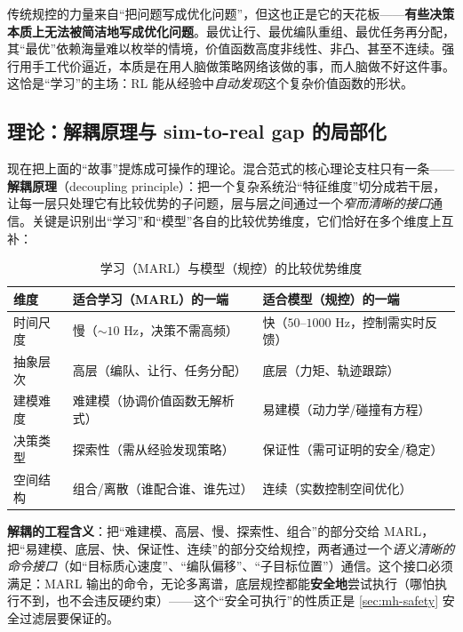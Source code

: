 \begin{insight}
传统规控的力量来自“把问题写成优化问题”，但这也正是它的天花板——\textbf{有些决策本质上无法被简洁地写成优化问题}。最优让行、最优编队重组、最优任务再分配，其“最优”依赖海量难以枚举的情境，价值函数高度非线性、非凸、甚至不连续。强行用手工代价逼近，本质是在用人脑做策略网络该做的事，而人脑做不好这件事。这恰是“学习”的主场：RL 能从经验中\emph{自动发现}这个复杂价值函数的形状。
\end{insight}

\subsection{理论：解耦原理与 sim-to-real gap 的局部化}
\label{sec:mh-decoupling}

现在把上面的“故事”提炼成可操作的理论。混合范式的核心理论支柱只有一条——\textbf{解耦原理}（decoupling principle）：把一个复杂系统沿“特征维度”切分成若干层，让每一层只处理它有比较优势的子问题，层与层之间通过一个\emph{窄而清晰的接口}通信。关键是识别出“学习”和“模型”各自的比较优势维度，它们恰好在多个维度上互补：

\begin{table}[H]\centering\small
\caption{学习（MARL）与模型（规控）的比较优势维度}
\label{tab:mh-decouple-dims}
\begin{tabular}{lll}
\toprule
维度 & 适合学习（MARL）的一端 & 适合模型（规控）的一端 \\
\midrule
时间尺度 & 慢（$\sim 10$ Hz，决策不需高频） & 快（$50$--$1000$ Hz，控制需实时反馈） \\
抽象层次 & 高层（编队、让行、任务分配） & 底层（力矩、轨迹跟踪） \\
建模难度 & 难建模（协调价值函数无解析式） & 易建模（动力学/碰撞有方程） \\
决策类型 & 探索性（需从经验发现策略） & 保证性（需可证明的安全/稳定） \\
空间结构 & 组合/离散（谁配合谁、谁先过） & 连续（实数控制空间优化） \\
\bottomrule
\end{tabular}
\end{table}

\noindent\textbf{解耦的工程含义}：把“难建模、高层、慢、探索性、组合”的部分交给 MARL，把“易建模、底层、快、保证性、连续”的部分交给规控，两者通过一个\emph{语义清晰的命令接口}（如“目标质心速度”、“编队偏移”、“子目标位置”）通信。这个接口必须满足：MARL 输出的命令，无论多离谱，底层规控都能\textbf{安全地}尝试执行（哪怕执行不到，也不会违反硬约束）——这个“安全可执行”的性质正是 \cref{sec:mh-safety} 安全过滤层要保证的。

